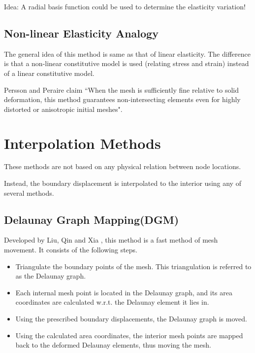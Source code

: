 \documentclass{article}
\begin{document}
Idea: A radial basis function could be used to determine the elasticity variation!
 

\subsection{Non-linear Elasticity Analogy}
The general idea of this method is same as that of linear elasticity. The difference is that a non-linear constitutive model is used (relating stress and strain) instead of a linear constitutive model. 

Persson and Peraire claim \cite{persson} ``When the mesh is sufficiently fine relative to solid deformation, this method guarantees non-intersecting elements even for highly distorted or anisotropic initial meshes".
 

\section{Interpolation Methods}
 
These methods are not based on any physical relation between node locations.

Instead, the boundary displacement is interpolated to the interior using any of several methods.
 

\subsection{Delaunay Graph Mapping(DGM)}
Developed by Liu, Qin and Xia \cite{dgm}, this method is a fast method of mesh movement. It consists of the following steps.
\begin{itemize}
\item Triangulate the boundary points of the mesh. This triangulation is referred to as the Delaunay graph.
\item Each internal mesh point is located in the Delaunay graph, and its area coordinates are calculated w.r.t. the Delaunay element it lies in.
\item Using the prescribed boundary displacements, the Delaunay graph is moved.
\item Using the calculated area coordinates, the interior mesh points are mapped back to the deformed Delaunay elements, thus moving the mesh.
\end{itemize}
\end{document}
